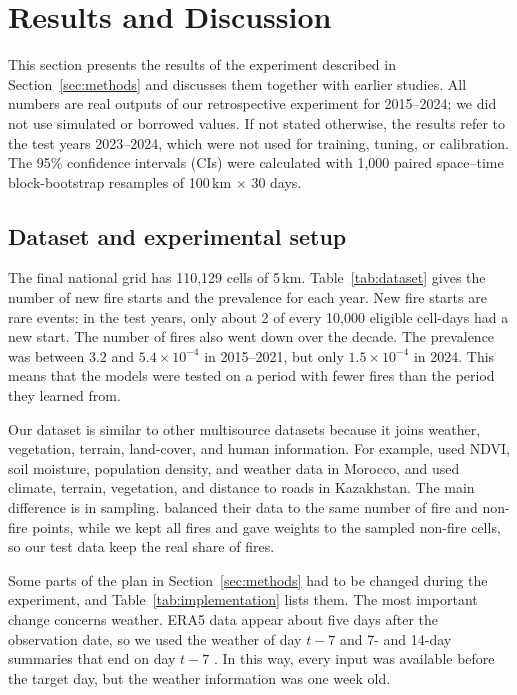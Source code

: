 \section{Results and Discussion}\label{sec:results}

This section presents the results of the experiment described in Section~\ref{sec:methods} and discusses them together with earlier studies. All numbers are real outputs of our retrospective experiment for 2015--2024; we did not use simulated or borrowed values. If not stated otherwise, the results refer to the test years 2023--2024, which were not used for training, tuning, or calibration. The 95\% confidence intervals (CIs) were calculated with 1,000 paired space--time block-bootstrap resamples of 100\,km $\times$ 30 days.

\subsection{Dataset and experimental setup}\label{sec:res_data}

The final national grid has 110,129 cells of 5\,km. Table~\ref{tab:dataset} gives the number of new fire starts and the prevalence for each year. New fire starts are rare events: in the test years, only about 2 of every 10,000 eligible cell-days had a new start. The number of fires also went down over the decade. The prevalence was between $3.2$ and $5.4\times10^{-4}$ in 2015--2021, but only $1.5\times10^{-4}$ in 2024. This means that the models were tested on a period with fewer fires than the period they learned from.

Our dataset is similar to other multisource datasets because it joins weather, vegetation, terrain, land-cover, and human information. For example, \cite{jadouli2024morocco} used NDVI, soil moisture, population density, and weather data in Morocco, and \cite{chepashev2025maxent} used climate, terrain, vegetation, and distance to roads in Kazakhstan. The main difference is in sampling. \cite{jadouli2024morocco} balanced their data to the same number of fire and non-fire points, while we kept all fires and gave weights to the sampled non-fire cells, so our test data keep the real share of fires.

Some parts of the plan in Section~\ref{sec:methods} had to be changed during the experiment, and Table~\ref{tab:implementation} lists them. The most important change concerns weather. ERA5 data appear about five days after the observation date, so we used the weather of day $t-7$ and 7- and 14-day summaries that end on day $t-7$ \cite{hersbach2020era5,openmeteoOpenData}. In this way, every input was available before the target day, but the weather information was one week old.

